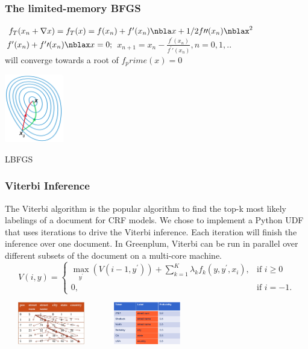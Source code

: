 \documentclass{beamer}
\begin{document}
\begin{frame}
  \frametitle{The limited-memory BFGS}
  $f_T(x_n+\nabla x)=f_T(x)=f(x_n)+f^\prime(x_n)\nbla x +1/2f\prime\prime(x_n)\nblax^2$\\
  $f^\prime(x_n)+f^\prime\prime(x_n)\nblax x=0;$
  $x_{n+1} = x_n - \frac{f^\prime(x_n)}{f^\prime\prime(x_n)},n=0,1,..$\\
  will converge towards a root of $f_prime(x)=0$
  \begin{center}
  \includegraphics[height=8em]{newton_grad.png}
  \end{center}
 LBFGS\\
 
\end{frame}

\begin{frame}
  \frametitle{Viterbi Inference}
  The Viterbi algorithm is the popular algorithm to find the top-k most likely labelings of a document 
for CRF models. 
We chose to implement a Python UDF that uses iterations to drive the Viterbi inference. Each iteration will 
finish the inference over one document.
In Greenplum, Viterbi can be run in parallel over different subsets 
of the document on a multi-core machine.
\[
V(i,y) =
\begin{cases}
 \max_{y^\prime}(V(i-1,y^\prime)) + \textstyle \sum_{k=1}^K \lambda_kf_k(y,y^\prime,x_i), & \text{if } i\ge0 \\
 0, & \text{if } i=-1.
\end{cases}
\]
\begin{center}		             
      \includegraphics[height=5em,width=11em]{viterbip.jpg}
      \includegraphics[height=5em,width=11em]{result.png}\\
\end{center}
\end{frame}
\end{document}
